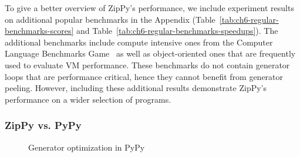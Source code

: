 To give a better overview of ZipPy's performance, we include experiment results on additional popular benchmarks in the Appendix (Table~\ref{tab:ch6-regular-benchmarks-scores} and Table~\ref{tab:ch6-regular-benchmarks-speedups}).
The additional benchmarks include compute intensive ones from the Computer Language Benchmarks Game~\cite{benchmarkgame} as well as object-oriented ones that are frequently used to evaluate VM performance.
These benchmarks do not contain generator loops that are performance critical, hence they cannot benefit from generator peeling.
However, including these additional results demonstrate ZipPy's performance on a wider selection of programs.

\subsubsection*{ZipPy vs. PyPy}

\begin{figure}
\centering
{}

\caption{Generator optimization in PyPy}
\label{fig:pypy_generator_inlining}
\end{figure}

